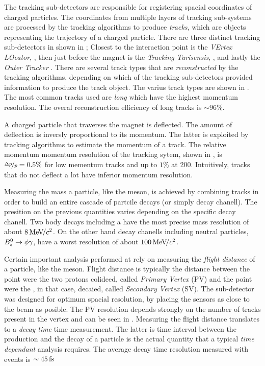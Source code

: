 The tracking sub-detectors are responsible for registering spacial coordinates of charged particles.
The coordinates from multiple layers of tracking sub-systems are processed by the tracking algorithms
to produce {\it tracks}, which are objects representing the trajectory of a charged particle. There are
three distinct tracking sub-detectors in \lhcb shown in ; Closest to the interaction point is
the {\it VErtex LOcator}, \velo, then just before the \lhcb magnet is the {\it Tracking Turisensis}, \ttracker,
and  lastly the {\it Outer Tracker} \ot. There are several track types that are {\it reconstructed} by
the tracking algorithms, depending on which of the tracking sub-detectors provided information to produce
the track object. The varius track types are shown in \figref{}. The most common tracks used are {\it long}
which have the highest momentum resolution. The overal reconstruction efficiency of long tracks is $\sim 96\%$.

A charged particle that traverses the \lhcb magnet is deflected. The amount of deflection is inversly proportional
to its momentum. The latter is exploited by tracking algorithms to estimate the momentum of a track. The relative
momentum momentum resolution of the tracking sytem, shown in , is $\nicefrac{\Delta p}{p} = 0.5 \%$
for low mementum tracks and up to $1\%$ at 200\gevc. Intuitively, tracks that do not deflect a lot have inferior momentum
resolution.

Measuring the mass a particle, like the \Bs meson, is achieved by combining tracks
in order to build an entire cascade of partcile decays (or simply decay chanell). The presition on the previous
quantities varies depending on the specific decay chanell. Two body \B decays including a \jpsi have the most
precise mass resolution of about $8 {\mathrm{\,Me\kern -0.1em V\!/}c^2}$. On the other hand decay chanells including neutral particles,
\ie $B^0_s\rightarrow\phi\gamma$, have a worst resolution of about $100 {\mathrm{\,Me\kern -0.1em V\!/}c^2}$.

Certain important analysis performed at \lhcb rely on measuring the {\it flight distance} of a particle, like the \Bs meson.
Flight distance is typically the distance between the point were the two protons colideed, called {\it Primary Vertex} (PV)
and the point were the \Bs, in that case, decaied, called {\it Secondary Vertex} (SV). The \velo sub-detector was designed
for optimum spacial resolution, by placing the \velo sensors as close to the beam as posible. The PV resolution depends
strongly on the number of tracks present in the vertex and can be seen in \figref{}. Measuring the flight distance translates
to a {\it decay time} time measurement. The latter is time interval between the production and the decay of a particle is the
actual quantity that a typical {\it time dependant} analysis requires. The average decay time resolution measured with \BsJpsiPhi
events is $\sim 45\rm \,fs$


